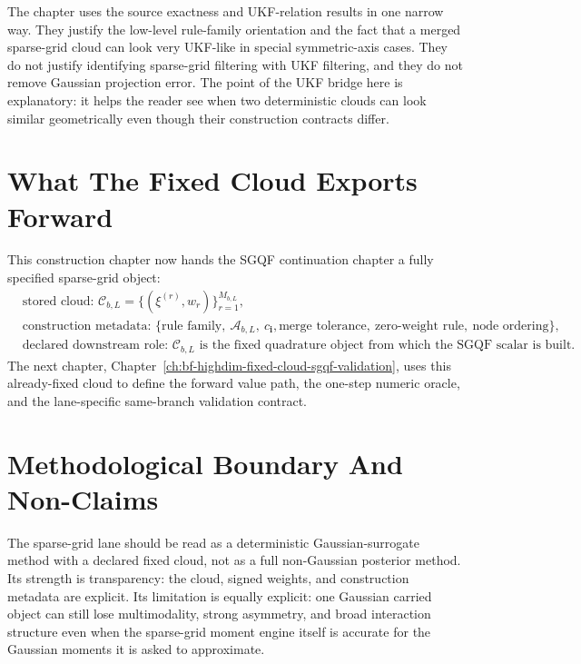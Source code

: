 The chapter uses the source exactness and UKF-relation results in one narrow
way.  They justify the low-level rule-family orientation and the fact that a
merged sparse-grid cloud can look very UKF-like in special symmetric-axis cases.
They do not justify identifying sparse-grid filtering with UKF filtering, and
they do not remove Gaussian projection error.  The point of the UKF bridge here
is explanatory: it helps the reader see when two deterministic clouds can look
similar geometrically even though their construction contracts differ.

\section{What The Fixed Cloud Exports Forward}
\label{sec:bf-hd-sgqf-exports}

This construction chapter now hands the SGQF continuation chapter a fully
specified sparse-grid object:
\begin{equation}
\begin{aligned}
  &\text{stored cloud: } \mathcal C_{b,L}=\{(\xi^{(r)},w_r)\}_{r=1}^{M_{b,L}},\\
  &\text{construction metadata: } \{\text{rule family},\ \mathcal A_{b,L},\ c_{\mathbf i},
  \text{merge tolerance},\ \text{zero-weight rule},\ \text{node ordering}\},\\
  &\text{declared downstream role: } \mathcal C_{b,L}
  \text{ is the fixed quadrature object from which the SGQF scalar is built.}
\end{aligned}
  \label{eq:bf-hd-sgqf-construction-export}
\end{equation}
The next chapter,
Chapter~\ref{ch:bf-highdim-fixed-cloud-sgqf-validation}, uses this already-fixed
cloud to define the forward value path, the one-step numeric oracle, and the
lane-specific same-branch validation contract.

\section{Methodological Boundary And Non-Claims}
\label{sec:bf-hd-sgqf-boundary}

The sparse-grid lane should be read as a deterministic Gaussian-surrogate method
with a declared fixed cloud, not as a full non-Gaussian posterior method.  Its
strength is transparency: the cloud, signed weights, and construction metadata
are explicit.  Its limitation is equally explicit: one Gaussian carried object
can still lose multimodality, strong asymmetry, and broad interaction structure
even when the sparse-grid moment engine itself is accurate for the Gaussian
moments it is asked to approximate.

